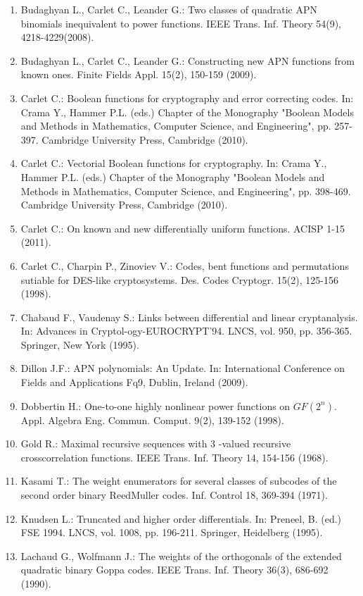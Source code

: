 \documentclass[10pt]{article}
\begin{document}
\begin{enumerate}
  \item Budaghyan L., Carlet C., Leander G.: Two classes of quadratic APN binomials inequivalent to power functions. IEEE Trans. Inf. Theory 54(9), 4218-4229(2008).
  \item Budaghyan L., Carlet C., Leander G.: Constructing new APN functions from known ones. Finite Fields Appl. 15(2), 150-159 (2009).
  \item Carlet C.: Boolean functions for cryptography and error correcting codes. In: Crama Y., Hammer P.L. (eds.) Chapter of the Monography "Boolean Models and Methods in Mathematics, Computer Science, and Engineering", pp. 257-397. Cambridge University Press, Cambridge (2010).
  \item Carlet C.: Vectorial Boolean functions for cryptography. In: Crama Y., Hammer P.L. (eds.) Chapter of the Monography "Boolean Models and Methods in Mathematics, Computer Science, and Engineering", pp. 398-469. Cambridge University Press, Cambridge (2010).
  \item Carlet C.: On known and new differentially uniform functions. ACISP 1-15 (2011).
  \item Carlet C., Charpin P., Zinoviev V.: Codes, bent functions and permutations sutiable for DES-like cryptosystems. Des. Codes Cryptogr. 15(2), 125-156 (1998).
  \item Chabaud F., Vaudenay S.: Links between differential and linear cryptanalysis. In: Advances in Cryptol-ogy-EUROCRYPT'94. LNCS, vol. 950, pp. 356-365. Springer, New York (1995).
  \item Dillon J.F.: APN polynomials: An Update. In: International Conference on Fields and Applications Fq9, Dublin, Ireland (2009).
  \item Dobbertin H.: One-to-one highly nonlinear power functions on $G F\left(2^{n}\right)$. Appl. Algebra Eng. Commun. Comput. 9(2), 139-152 (1998).
  \item Gold R.: Maximal recursive sequences with 3 -valued recursive crosscorrelation functions. IEEE Trans. Inf. Theory 14, 154-156 (1968).
  \item Kasami T.: The weight enumerators for several classes of subcodes of the second order binary ReedMuller codes. Inf. Control 18, 369-394 (1971).
  \item Knudsen L.: Truncated and higher order differentials. In: Preneel, B. (ed.) FSE 1994. LNCS, vol. 1008, pp. 196-211. Springer, Heidelberg (1995).
  \item Lachaud G., Wolfmann J.: The weights of the orthogonals of the extended quadratic binary Goppa codes. IEEE Trans. Inf. Theory 36(3), 686-692 (1990).

\end{enumerate}
\end{document}
